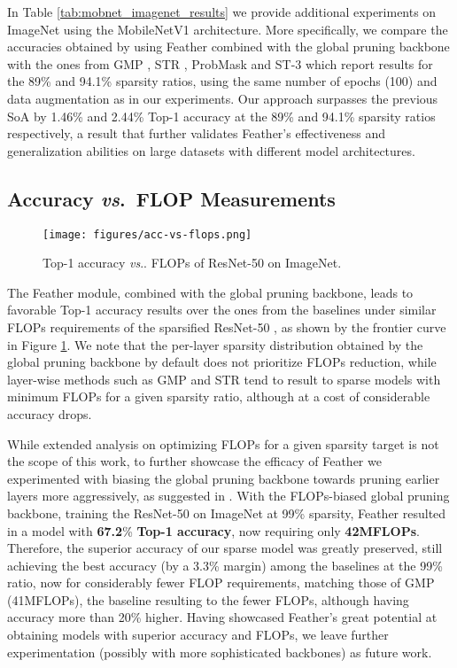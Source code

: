 \documentclass{article}
\makeatletter
\DeclareRobustCommand\onedot{\futurelet\@let@token\@onedot}
\def\@onedot{\ifx\@let@token.\else.\null\fi\xspace}
\newcommand{\vs}{\emph{vs}\onedot}
\makeatother
\begin{document}
In Table \ref{tab:mobnet_imagenet_results} we provide additional experiments on ImageNet \cite{russakovsky2015imagenet} using the MobileNetV1 \cite{howard2017mobilenets} architecture. More specifically, we compare the accuracies obtained by using Feather combined with the global pruning backbone with the ones from GMP \cite{zhu2017prune}, STR \cite{kusupati2020soft}, ProbMask \cite{zhou2021effective} and  ST-3 \cite{vanderschueren2023straight} which report results for the 89\% and 94.1\% sparsity ratios, using the same number of epochs (100) and data augmentation as in our experiments. Our approach surpasses the previous SoA by 1.46\% and 2.44\% Top-1 accuracy at the 89\% and 94.1\% sparsity ratios respectively, a result that further validates Feather's  effectiveness and generalization abilities on large datasets with different model architectures.

 
\subsection{Accuracy \emph{vs}.\ FLOP Measurements}


\begin{figure}[H]
	\centering
  \texttt{[image: figures/acc-vs-flops.png]}
\caption{ Top-1 accuracy \vs FLOPs of ResNet-50 on ImageNet.} 
\label{fig:acc_vs_flops}
\end{figure}


The Feather module, combined with the global pruning backbone, leads to favorable Top-1 accuracy results over the ones from the baselines under similar FLOPs requirements of the sparsified ResNet-50 \cite{he2016deep}, as shown by the frontier curve in Figure \ref{fig:acc_vs_flops}. We note that the per-layer sparsity distribution obtained by the global pruning backbone by default does not prioritize FLOPs reduction, while layer-wise methods such as GMP \cite{zhu2017prune} and STR \cite{kusupati2020soft} tend to result to sparse models with minimum FLOPs for a given sparsity ratio, although at a cost of considerable accuracy drops. 

 
While extended analysis on optimizing FLOPs for a given sparsity target is not the scope of this work, to further showcase the efficacy of Feather we experimented with biasing the global pruning backbone towards pruning earlier layers more aggressively, as suggested in \cite{vanderschueren2023straight}. With the FLOPs-biased global pruning backbone, training the ResNet-50 on ImageNet at 99\% sparsity, Feather resulted in a model with \textbf{67.2}\% \textbf{Top-1 accuracy}, now requiring only \textbf{42MFLOPs}. Therefore, the superior accuracy of our sparse model was greatly preserved,  still achieving the best accuracy (by a 3.3\% margin) among the baselines at the 99\% ratio, now for considerably fewer FLOP requirements, matching those of  GMP (41MFLOPs), the baseline resulting to the fewer FLOPs, although having accuracy more than 20\% higher. Having showcased Feather's great potential at obtaining models with superior accuracy and FLOPs, we leave further experimentation (possibly with more sophisticated backbones) as future work.
 
 
\end{document}
